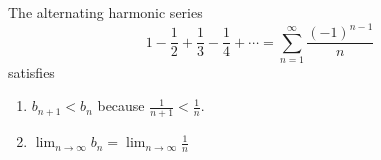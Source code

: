 \begin{frame}
\begin{example}[Example 1, p. 747]
The alternating harmonic series
\abovedisplayskip=0pt
\belowdisplayskip=0pt
\[
1 - \frac{1}{2} + \frac{1}{3} - \frac{1}{4} + \cdots = \sum_{n=1}^\infty \frac{(-1)^{n-1}}{n}
\]
satisfies
\begin{enumerate}
\item  $b_{n+1} < b_n$ because $\frac{1}{n+1} < \frac{1}{n}$.
\item  $\lim_{n\to\infty} b_n = $\alert<handout:0| 2-3>{$\lim_{n\to\infty} \frac{1}{n}$  }
\end{enumerate}
\end{example}
\end{frame}
